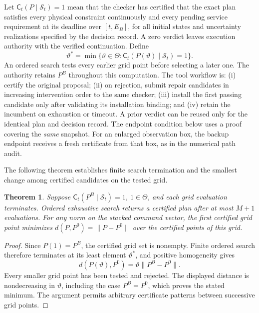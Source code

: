 \documentclass[journal,10pt]{IEEEtran}
\newtheorem{theorem}{Theorem}
\begin{document}
Let $\mathsf C_t(P\mid\mathcal S_t)=1$ mean that the checker has certified
that the exact plan satisfies every physical constraint continuously and
every pending service requirement at its deadline over $[t,E_B]$, for all
initial states and uncertainty realizations specified by the decision record. A zero verdict leaves execution authority with the
verified continuation. Define
\begin{equation}
\vartheta^*=\min\{\vartheta\in\Theta:
                  \mathsf C_t(P(\vartheta)\mid\mathcal S_t)=1\}.
\label{eq:repair-selection}
\end{equation}
An ordered search tests every earlier grid point before selecting a later
one. The authority retains $P^B$ throughout this computation. The tool workflow
is: (i) certify the original proposal; (ii) on rejection, submit repair
candidates in increasing intervention order to the same checker; (iii)
install the first passing candidate only after validating its installation
binding; and (iv) retain the incumbent on exhaustion or timeout. A prior
verdict can be reused only for the identical plan and decision record. The endpoint
condition below uses a proof covering the \emph{same} snapshot. For an
enlarged observation box, the backup endpoint receives a fresh certificate
from that box, as in the numerical path audit.

The following theorem establishes finite search termination and the smallest change among certified candidates on the tested grid.

\begin{theorem}
\label{thm:repair-grid}
Suppose $\mathsf C_t(P^B\mid\mathcal S_t)=1$, $1\in\Theta$, and each
grid evaluation terminates. Ordered exhaustive search returns a certified
plan after at most $M+1$ evaluations. For any norm on the stacked command
vector, the first certified grid point minimizes
$d(P,P^0)=\|P-P^0\|$ over the certified points of this grid.
\end{theorem}
\begin{proof}
Since $P(1)=P^B$, the certified grid set is nonempty. Finite ordered search
therefore terminates at its least element $\vartheta^*$, and positive
homogeneity gives
\[
d(P(\vartheta),P^0)=\vartheta\|P^B-P^0\|.
\]
Every smaller grid point has been tested and rejected. The displayed
distance is nondecreasing in $\vartheta$, including the case $P^B=P^0$,
which proves the stated minimum. The argument permits arbitrary certificate
patterns between successive grid points.
\end{proof}
\end{document}
